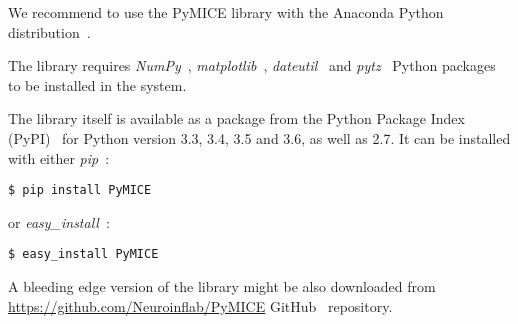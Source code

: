We recommend to use the PyMICE library with the Anaconda Python distribution~\cite{anacondaSoftware}.

The library requires \emph{NumPy}~\cite{wald2011,Oliphant:2007ud},
\emph{matplotlib}~\cite{citeulike:2878517}, \emph{dateutil}~\cite{dateutil} and \emph{pytz}~\cite{pytz}
Python packages to be installed in the system.

\begin{samepage}
The library itself is available as a package from the Python Package Index (PyPI)~\cite{pep0301,pypi}
for Python version 3.3, 3.4, 3.5 and 3.6, as well as 2.7.
It can be installed with either \emph{pip}~\cite{pip}:

\begin{verbatim}
$ pip install PyMICE
\end{verbatim}

or \emph{easy\_install}~\cite{setuptools}:

\begin{verbatim}
$ easy_install PyMICE
\end{verbatim}
\end{samepage}

A bleeding edge version of the library might be also downloaded from
\url{https://github.com/Neuroinflab/PyMICE} GitHub~\cite{github} repository.
